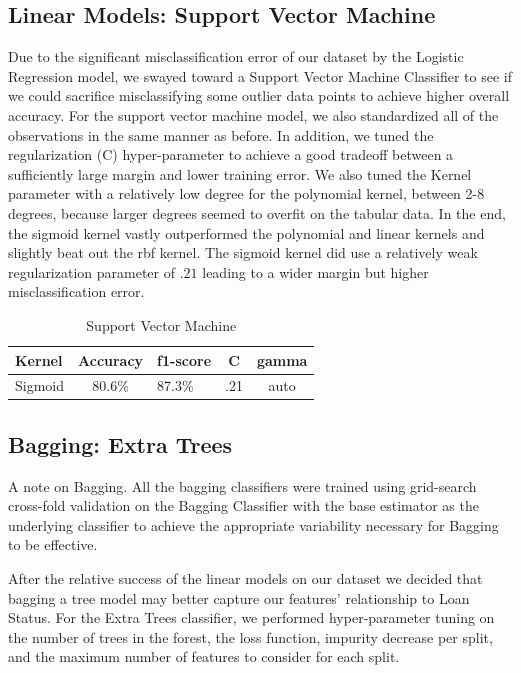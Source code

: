 \documentclass[conference]{IEEEtran}
\begin{document}
\subsection{Linear Models: Support Vector Machine}
Due to the significant misclassification error of our dataset by the Logistic Regression model, we swayed toward a Support Vector Machine Classifier to see if we could sacrifice misclassifying some outlier data points to achieve higher overall accuracy. For the support vector machine model, we also standardized all of the observations in the same manner as before. In addition, we tuned the regularization (C) hyper-parameter to achieve a good tradeoff between a sufficiently large margin and lower training error. We also tuned the Kernel parameter with a relatively low degree for the polynomial kernel, between 2-8 degrees, because larger degrees seemed to overfit on the tabular data. In the end, the sigmoid kernel vastly outperformed the polynomial and linear kernels and slightly beat out the rbf kernel. The sigmoid kernel did use a relatively weak regularization parameter of $.21$ leading to a wider margin but higher misclassification error. 
\begin{table}[H]
\centering
  \begin{tabular}{|l|c|l|c|c|} \hline 
 
Kernel& Accuracy&  f1-score&C& gamma\\ \hline 

Sigmoid& 80.6\%&  87.3\%&.21& auto\\\hline 
\end{tabular}

 \caption{Support Vector Machine}
 \end{table}

\subsection{Bagging: Extra Trees}
A note on Bagging. All the bagging classifiers were trained using grid-search cross-fold validation on the Bagging Classifier with the base estimator as the underlying classifier to achieve the appropriate variability necessary for Bagging to be effective. 

After the relative success of the linear models on our dataset we decided that bagging a tree model may better capture our features' relationship to Loan Status. For the Extra Trees classifier, we performed hyper-parameter tuning on the number of trees in the forest, the loss function, impurity decrease per split, and the maximum number of features to consider for each split. 
\end{document}
